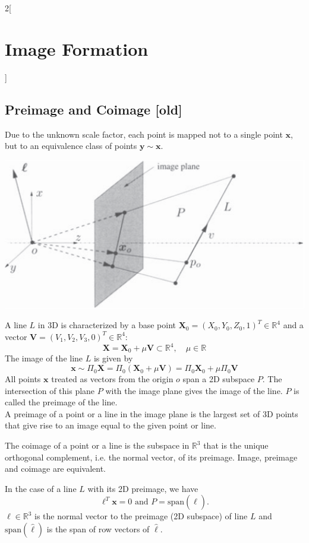 \documentclass[oneside,fontsize=11pt,paper=a4]{scrartcl}
\newenvironment{myfigure}
  {\par\medskip\noindent\minipage{\linewidth}}
  {\endminipage\par\medskip}
\begin{document}
\begin{multicols}{2}[\section{Image Formation}]
\subsection{Preimage and Coimage [old]}
Due to the unknown scale factor, each point is mapped not to a single point $\boldsymbol{x}$, but to an equivalence class of points $\boldsymbol{y} \sim \boldsymbol{x}$.
\begin{myfigure}
	\centering
	\includegraphics[width=0.8\linewidth]{Images/preimage.PNG}
\end{myfigure}
A line $L$ in 3D is characterized by a base point $\boldsymbol{X}_0 = (X_0, Y_0, Z_0, 1)^T \in \mathbb{R}^4$ and a vector $\boldsymbol{V} = (V_1, V_2, V_3, 0)^T \in \mathbb{R}^4$:
\begin{equation*}
    \boldsymbol{X} = \boldsymbol{X}_0 + \mu \boldsymbol{V} \subset \mathbb{R}^4, \quad \mu \in \mathbb{R}
\end{equation*}
The image of the line $L$ is given by
\begin{equation*}
    \boldsymbol{x} \sim \Pi_0 \boldsymbol{X} = \Pi_0(\boldsymbol{X}_0 + \mu \boldsymbol{V}) = \Pi_0 \boldsymbol{X}_0 + \mu \Pi_0 \boldsymbol{V}
\end{equation*}
All points $\boldsymbol{x}$ treated as vectors from the origin $o$ span a 2D subspace $P$.
The intersection of this plane $P$ with the image plane gives the image of the line.
$P$ is called the preimage of the line.\\
A preimage of a point or a line in the image plane is the largest
set of 3D points that give rise to an image equal to the given
point or line.\par
\vspace{11pt}
The coimage of a point or a line is the subspace in $\mathbb{R}^3$ that is the unique orthogonal complement, i.e. the normal vector, of its preimage.
Image, preimage and coimage are equivalent.\par

In the case of a line $L$ with its 2D preimage, we have
\begin{equation*}
    \boldsymbol{\ell}^T \boldsymbol{x} = 0 \text{  and  } P = \text{span}(\hat{\boldsymbol{\ell}}).
\end{equation*}
$\boldsymbol{\ell} \in \mathbb{R}^3$ is the normal vector to the preimage (2D subspace) of line $L$ and $\text{span}(\hat{\boldsymbol{\ell}})$ is the span of row vectors of $\hat{\boldsymbol{\ell}}$.


\end{multicols}
\end{document}
